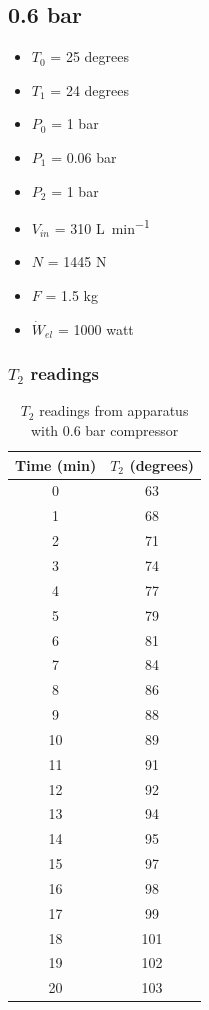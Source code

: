 \documentclass[class=article, crop=false, 12pt,a4paper]{standalone}
\begin{document}
\subsection{0.6 bar}
\begin{multicols}{2}
  \begin{itemize}[noitemsep]
    \item \(T_0\) = 25 degrees
    \item \(T_1\) = 24 degrees
    \item \(P_0\) = 1 \si{\bar}
    \item \(P_1\) = 0.06 \si{\bar}
    \item \(P_2\) = 1 \si{\bar}
    \item \(V_{in}\) = 310 \si{\liter\per\minute}
    \item \(N\) = 1445 \si{\newton}
    \item \(F\) = 1.5 \si{\kilogram}
    \item \(\dot{W}_{el}\) = 1000 \si{watt}
  \end{itemize}
\end{multicols}
\subsubsection{\(T_2\) readings}
\begin{table}
  \centering
    \begin{tabular}{|c|c|}
      \hline
      Time (\si{\minute}) & \(T_2\) (degrees)\\
      \hline  
      0 & 63\\
      1 & 68\\
      2 & 71\\
      3 & 74\\
      4 & 77\\
      5 & 79\\
      6 & 81\\
      7 & 84\\
      8 & 86\\
      9 & 88\\
      10 & 89\\
      11 & 91\\
      12 & 92\\
      13 & 94\\
      14 & 95\\
      15 & 97\\
      16 & 98\\
      17 & 99\\
      18 & 101\\
      19 & 102\\
      20 & 103\\
      \hline
    \end{tabular}
  \caption{\(T_2\) readings from apparatus with 0.6 bar compressor}
  \label{table:2}
\end{table}
\end{document}
